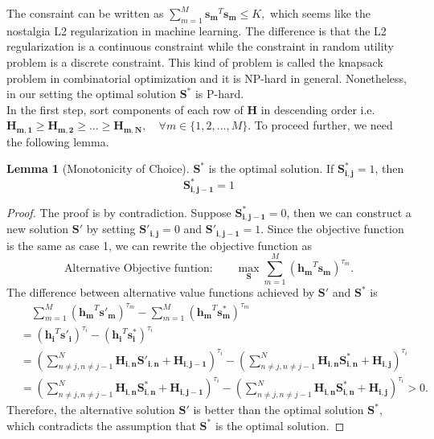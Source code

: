 \documentclass[12pt]{article}
\theoremstyle{definition}
\newtheorem{lemma}[theorem]{Lemma}
\newcommand{\matr}[1]{\mathbf{#1}} %
\begin{document}
\begin{sloppypar}
The consraint can be written as $\sum_{m=1}^{M}\matr{s_m}^T\matr{s_m} \leq K,$ which seems like the nostalgia L2 regularization in machine learning. The difference is that the L2 regularization is a continuous constraint while the constraint in random utility problem is a discrete constraint. This kind of problem is called the knapsack problem in combinatorial optimization and it is NP-hard in general. Nonetheless, in our setting the optimal solution $\matr{S}^*$ is P-hard. \\
\indent In the first step, sort components of each row of $\matr{H}$ in descending order i.e. $\matr{H_{m,1}} \geq \matr{H_{m,2}} \geq ... \geq \matr{H_{m,N}}, \quad \forall m \in \{1,2,...,M\}$. To proceed further, we need the following lemma.


\begin{lemma}[Monotonicity of Choice]\label{lemma1}
    $\matr{S^*}$ is the optimal solution. If $\matr{S^*_{i,j}} = 1$, then
    \begin{equation*}
        \matr{S^*_{i,j-1}} = 1
    \end{equation*}
\end{lemma}

\begin{proof}
    The proof is by contradiction. Suppose $\matr{S^*_{i,j-1}} = 0$, then we can construct a new solution $\matr{S'}$ by setting $\matr{S'_{i,j}} = 0$ and $\matr{S'_{i,j-1}} = 1$. Since the objective function is the same as case 1, we can rewrite the objective function as 
    \begin{equation*}
        \text{Alternative Objective funtion:} \qquad \max_{\matr{S}} \sum_{m=1}^{M}(\matr{h_m}^T \matr{s_m})^{\tau_m}.
    \end{equation*}
    The difference between alternative value functions achieved by $\matr{S'}$ and $\matr{S^*}$ is
    \begin{equation*}
    \begin{aligned}
        &\quad \sum_{m=1}^{M}(\matr{h_m}^T \matr{s'_m})^{\tau_m} - \sum_{m=1}^{M}(\matr{h_m}^T \matr{s^*_m})^{\tau_m} \\
        &= (\matr{h_i}^T \matr{s'_i})^{\tau_i} - (\matr{h_i}^T \matr{s^*_i})^{\tau_i} \\
        &= (\sum\limits_{n \neq j, n \neq j-1}^{N} \matr{H_{i,n}} \matr{S'_{i,n}}+\matr{H_{i,j-1}})^{\tau_i} - (\sum\limits_{n \neq j, n \neq j-1}^{N} \matr{H_{i,n}} \matr{S^*_{i,n}}+\matr{H_{i,j}})^{\tau_i}\\
        &= (\sum\limits_{n \neq j, n \neq j-1}^{N} \matr{H_{i,n}} \matr{S^*_{i,n}}+\matr{H_{i,j-1}})^{\tau_i} - (\sum\limits_{n \neq j, n \neq j-1}^{N} \matr{H_{i,n}} \matr{S^*_{i,n}}+\matr{H_{i,j}})^{\tau_i}> 0.
    \end{aligned}
    \end{equation*}
    Therefore, the alternative solution $\matr{S'}$ is better than the optimal solution $\matr{S^*}$, which contradicts the assumption that $\matr{S^*}$ is the optimal solution.
\end{proof}



\end{sloppypar}
\end{document}
